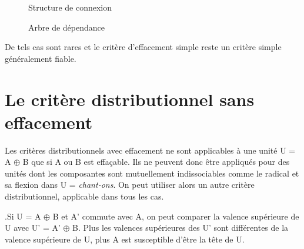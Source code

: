 {    \begin{figure}[H]
    \captionsetup{margin=.05\textwidth}%
    \begin{floatrow}%
            {\caption{Structure de connexion\label{fig:that1}}}%
            {\caption{Arbre de dépendance\label{fig:that2}}}
    \end{floatrow}
    \end{figure}
   
   De tels cas sont rares et le critère d’effacement simple reste un critère simple généralement fiable.
}
\section{Le critère distributionnel sans effacement}\label{sec:3.3.13}

Les critères distributionnels avec effacement ne sont applicables à une unité U = A ${\oplus}$ B que si A ou B est effaçable. Ils ne peuvent donc être appliqués pour des unités dont les composantes sont mutuellement indissociables comme le radical et sa flexion dans U = \textit{chant-ons}. On peut utiliser alors un autre critère distributionnel, applicable dans tous les cas.

{.Si U = A ${\oplus}$ B et A' commute avec A, on peut comparer la valence supérieure de U avec U’ = A’ ${\oplus}$ B. Plus les valences supérieures des U' sont différentes de la valence supérieure de U, plus A est susceptible d'être la tête de U.}

